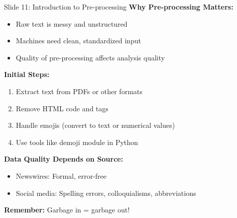 \documentclass[8pt]{beamer}
\begin{document}
	\begin{frame}{Slide 11: Introduction to Pre-processing}
		\fontsize{6.5}{7.5}\selectfont
		\textbf{Why Pre-processing Matters:}
		\begin{itemize}
			\item Raw text is messy and unstructured
			\item Machines need clean, standardized input
			\item Quality of pre-processing affects analysis quality
		\end{itemize}
		
		\vspace{0.1cm}
		\textbf{Initial Steps:}
		\begin{enumerate}
			\item Extract text from PDFs or other formats
			\item Remove HTML code and tags
			\item Handle emojis (convert to text or numerical values)
			\item Use tools like demoji module in Python
		\end{enumerate}
		
		\vspace{0.1cm}
		\textbf{Data Quality Depends on Source:}
		\begin{itemize}
			\item Newswires: Formal, error-free
			\item Social media: Spelling errors, colloquialisms, abbreviations
		\end{itemize}
		
		\textcolor{myblue}{\textbf{Remember:}} Garbage in = garbage out!
	\end{frame}
	
\end{document}

